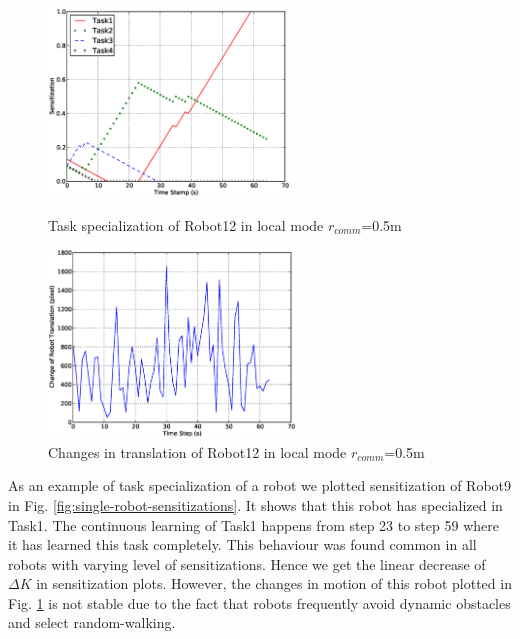 \documentclass[letterpaper, 10 pt, conference]{ieeeconf}  %
\begin{document}
\begin{figure}
\begin{minipage}[t]{0.5\linewidth}
\centering
\includegraphics[height=5cm, angle=0]{images/local-500cm/PlotRobot12-Sensitizations-2010Feb16-150432.eps}
\caption{\small Task specialization of Robot12 in local mode $r_{comm}$=0.5m}
\label{fig:single-robot-sensitizations} %
\end{minipage} 
\begin{minipage}[t]{0.5\linewidth}
\centering
\includegraphics[height=5cm, angle=0]{images/local-500cm/DeltaRobot12-PoseAtTS-2010Feb16-150432.eps}
\caption{\small Changes in translation of Robot12 in local mode $r_{comm}$=0.5m}
\label{fig:single-robot-translation} %
\end{minipage}
\end{figure}
As an example of task specialization of a robot we plotted sensitization of Robot9 in Fig. \ref{fig:single-robot-sensitizations}. It shows that this robot has specialized in Task1. The continuous learning of Task1 happens from step 23 to step 59 where it has learned this task completely. This behaviour was found common in all robots with varying level of sensitizations. Hence we get the linear decrease of $\Delta K$ in sensitization plots. However, the changes in motion of this robot plotted in Fig. \ref{fig:single-robot-translation} is not stable due to the fact that robots frequently avoid dynamic obstacles and select random-walking.
%
\end{document}
